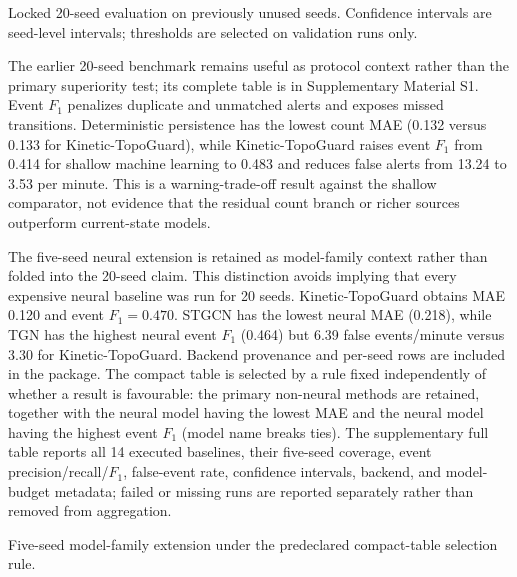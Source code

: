 \documentclass[final,5p,times,twocolumn]{elsarticle}
\begin{document}
\begin{table}[t]
\centering
\caption{Locked 20-seed evaluation on previously unused seeds. Confidence intervals are
seed-level intervals; thresholds are selected on validation runs only.}
\label{tab:locked-confirmatory}
\begin{adjustbox}{width=\textwidth}

\end{adjustbox}
\end{table}

The earlier 20-seed benchmark remains useful as protocol context rather than the primary
superiority test; its complete table is in Supplementary Material S1. Event $F_1$ penalizes duplicate and
unmatched alerts and exposes missed transitions. Deterministic persistence has the lowest
count MAE (0.132 versus 0.133 for Kinetic-TopoGuard), while Kinetic-TopoGuard raises event
$F_1$ from 0.414 for shallow machine learning to 0.483 and reduces false alerts from 13.24
to 3.53 per minute. This is a warning-trade-off result against the shallow comparator, not
evidence that the residual count branch or richer sources outperform current-state models.

The five-seed neural extension is retained as model-family context rather than folded into
the 20-seed claim. This distinction avoids implying that every expensive neural baseline
was run for 20 seeds. Kinetic-TopoGuard obtains MAE 0.120 and event $F_1=0.470$.
STGCN has the lowest neural MAE (0.218), while TGN has the highest neural event
$F_1$ (0.464) but 6.39 false events/minute versus 3.30 for Kinetic-TopoGuard.
Backend provenance and per-seed rows are included in the package.
The compact table is selected by a rule fixed independently of whether a result is
favourable: the primary non-neural methods are retained, together with the neural model
having the lowest MAE and the neural model having the highest event $F_1$ (model name
breaks ties). The supplementary full table reports all 14 executed baselines, their
five-seed coverage, event precision/recall/$F_1$, false-event rate, confidence intervals,
backend, and model-budget metadata; failed or missing runs are reported separately rather
than removed from aggregation.

\begin{table}[t]
\centering
\caption{Five-seed model-family extension under the predeclared compact-table selection rule.}
\label{tab:neural}
\begin{adjustbox}{width=\linewidth}

\end{adjustbox}
\end{table}
\end{document}
